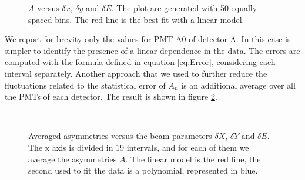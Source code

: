 \begin{figure}[!hbtp]
\caption{ $A$ versus $\delta x$, $\delta y$ and $\delta E$. The plot are generated with 50 equally spaced bins. The red line is the best fit with a linear model.}
\label{fig:XYEfit}
\end{figure} 

We report for brevity only the values for PMT A0 of detector A. In this case is simpler to identify the presence of a linear dependence in the data. The errors are computed with the formula defined in equation \ref{eq:Error}, considering each interval separately.
Another approach that we used to further reduce the fluctuations related to the statistical error of $A_{n}$ is an additional average over all the PMTs of each detector. The result is shown in figure \ref{fig:DifferentModels}.

\begin{figure}[ht]
\centering
{}
\\
\caption{Averaged asymmetries versus the beam parameters $\delta X$, $\delta Y$ and $\delta E$. The x axis is divided in $19$ intervals, and for each of them we average the asymmetries $A$. The linear model is the red line, the second used to fit the data is a polynomial, represented in blue. }
\label{fig:DifferentModels}
\end{figure}

